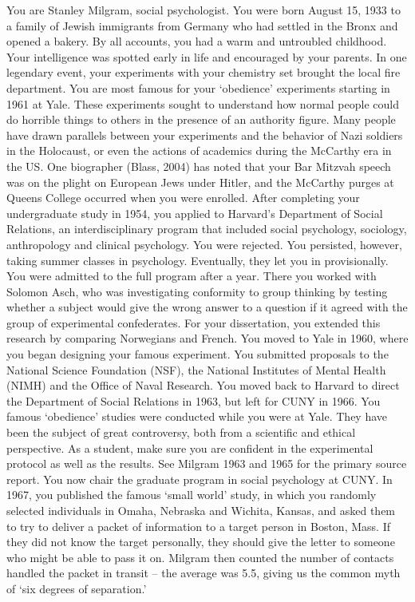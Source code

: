 You are Stanley Milgram, social psychologist. You were born August 15, 1933 to a family of Jewish immigrants from Germany who had settled in the Bronx and opened a bakery. By all accounts, you had a warm and untroubled childhood.
Your intelligence was spotted early in life and encouraged by your parents. In one legendary event, your experiments with your chemistry set brought the local fire department. You are most famous for your `obedience' experiments starting in 1961 at Yale. These experiments sought to understand how normal people could do horrible things to others in the presence of an authority figure. Many people have drawn parallels between your experiments and the behavior of Nazi soldiers in the Holocaust, or even the actions of academics during the McCarthy era in the US. One biographer (Blass, 2004) has noted that your Bar Mitzvah speech was on the plight on European Jews under Hitler, and the McCarthy purges at Queens College occurred when you were enrolled.
After completing your undergraduate study in 1954, you applied to Harvard's Department of Social Relations, an interdisciplinary program that included social psychology, sociology, anthropology and clinical psychology. You were rejected. You persisted, however, taking summer classes in psychology. Eventually, they let you in provisionally. You were admitted to the full program after a year.
There you worked with Solomon Asch, who was investigating conformity to group thinking by testing whether a subject would give the wrong answer to a question if it agreed with the group of experimental confederates. For your dissertation, you extended this research by comparing Norwegians and French.
You moved to Yale in 1960, where you began designing your famous experiment. You submitted proposals to the National Science Foundation (NSF), the National Institutes of Mental Health (NIMH) and the Office of Naval Research.
You moved back to Harvard to direct the Department of Social Relations in 1963, but left for CUNY in 1966. You famous `obedience' studies were conducted while you were at Yale. They have been the subject of great controversy, both from a scientific and ethical perspective. As a student, make sure you are confident in the experimental protocol as well as the results. See Milgram 1963 and 1965 for the primary source report.
You now chair the graduate program in social psychology at CUNY.
In 1967, you published the famous `small world' study, in which you randomly selected individuals in Omaha, Nebraska and Wichita, Kansas, and asked them to try to deliver a packet of information to a target person in Boston, Mass. If they did not know the target personally, they should give the letter to someone who might be able to pass it on. Milgram then counted the number of contacts handled the packet in transit – the average was 5.5, giving us the common myth of `six degrees of separation.' 

